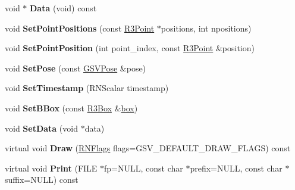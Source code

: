 \begin{DoxyCompactItemize}
\item 
void $\ast$ {\bfseries Data} (void) const \hypertarget{class_g_s_v_scanline_a96f7a44467112a3e0b0ed6c6c99acacd}{}\label{class_g_s_v_scanline_a96f7a44467112a3e0b0ed6c6c99acacd}

\item 
void {\bfseries Set\+Point\+Positions} (const \hyperlink{class_r3_point}{R3\+Point} $\ast$positions, int npositions)\hypertarget{class_g_s_v_scanline_a986dbadf5fc9267304804af456e59e48}{}\label{class_g_s_v_scanline_a986dbadf5fc9267304804af456e59e48}

\item 
void {\bfseries Set\+Point\+Position} (int point\+\_\+index, const \hyperlink{class_r3_point}{R3\+Point} \&position)\hypertarget{class_g_s_v_scanline_a58a9930325c8c56742a21e62d3a38eb7}{}\label{class_g_s_v_scanline_a58a9930325c8c56742a21e62d3a38eb7}

\item 
void {\bfseries Set\+Pose} (const \hyperlink{class_g_s_v_pose}{G\+S\+V\+Pose} \&pose)\hypertarget{class_g_s_v_scanline_af71dfd56ad4a8038276b8d3aafae564b}{}\label{class_g_s_v_scanline_af71dfd56ad4a8038276b8d3aafae564b}

\item 
void {\bfseries Set\+Timestamp} (R\+N\+Scalar timestamp)\hypertarget{class_g_s_v_scanline_a2b167171ca8e25197924aae236e8d139}{}\label{class_g_s_v_scanline_a2b167171ca8e25197924aae236e8d139}

\item 
void {\bfseries Set\+B\+Box} (const \hyperlink{class_r3_box}{R3\+Box} \&\hyperlink{structbox}{box})\hypertarget{class_g_s_v_scanline_a3183f31feedc8faebba6b88164564c81}{}\label{class_g_s_v_scanline_a3183f31feedc8faebba6b88164564c81}

\item 
void {\bfseries Set\+Data} (void $\ast$data)\hypertarget{class_g_s_v_scanline_a4ecd2307f7cd94a4b96219adbaf7a8ce}{}\label{class_g_s_v_scanline_a4ecd2307f7cd94a4b96219adbaf7a8ce}

\item 
virtual void {\bfseries Draw} (\hyperlink{class_r_n_flags}{R\+N\+Flags} flags=G\+S\+V\+\_\+\+D\+E\+F\+A\+U\+L\+T\+\_\+\+D\+R\+A\+W\+\_\+\+F\+L\+A\+GS) const \hypertarget{class_g_s_v_scanline_a480932fb4bb263d69dce2fa3d315e95b}{}\label{class_g_s_v_scanline_a480932fb4bb263d69dce2fa3d315e95b}

\item 
virtual void {\bfseries Print} (F\+I\+LE $\ast$fp=N\+U\+LL, const char $\ast$prefix=N\+U\+LL, const char $\ast$suffix=N\+U\+LL) const \hypertarget{class_g_s_v_scanline_a0fdb1af22837e1060ff36a646227ca57}{}\label{class_g_s_v_scanline_a0fdb1af22837e1060ff36a646227ca57}


\end{DoxyCompactItemize}
